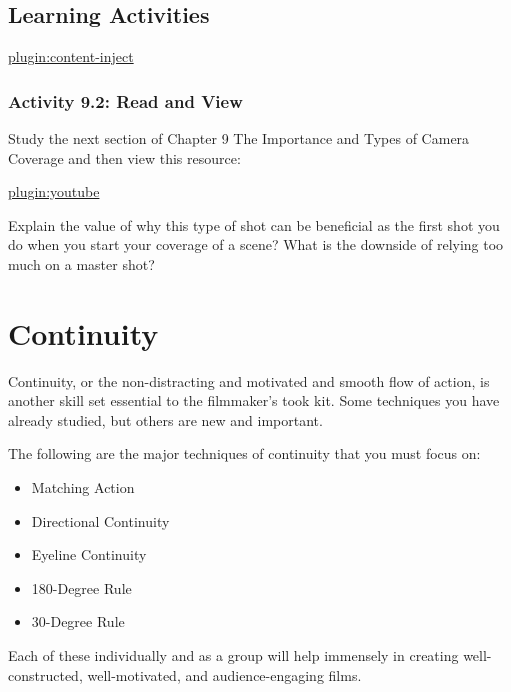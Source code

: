 \documentclass[
]{book}
\begin{document}
\hypertarget{learning-activities-36}{%
\subsection*{Learning Activities}\label{learning-activities-36}}

\href{../_9-2}{plugin:content-inject}

\hypertarget{activity-9.2-read-and-view}{%
\subsubsection*{Activity 9.2: Read and View}\label{activity-9.2-read-and-view}}

Study the next section of Chapter 9 The Importance and Types of Camera Coverage and then view this resource:

\href{https://www.youtube.com/watch?v=cz3nBkIa9K0}{plugin:youtube}

Explain the value of why this type of shot can be beneficial as the first shot you do when you start your coverage of a scene? What is the downside of relying too much on a master shot?

\hypertarget{continuity}{%
\section*{Continuity}\label{continuity}}

Continuity, or the non-distracting and motivated and smooth flow of action, is another skill set essential to the filmmaker's took kit. Some techniques you have already studied, but others are new and important.

The following are the major techniques of continuity that you must focus on:

\begin{itemize}
\item
  Matching Action
\item
  Directional Continuity
\item
  Eyeline Continuity
\item
  180-Degree Rule
\item
  30-Degree Rule
\end{itemize}

Each of these individually and as a group will help immensely in creating well-constructed, well-motivated, and audience-engaging films.
\end{document}
